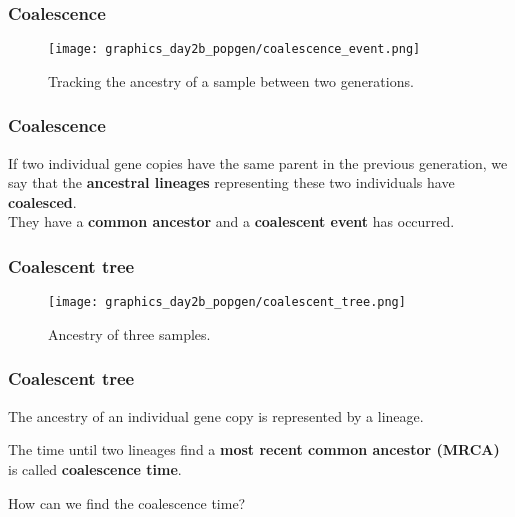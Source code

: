 \documentclass{beamer}
\newcommand{\1}{\ensuremath{\mathbf{1}}}
\begin{document}
%
%
%
\begin{frame}\frametitle{Coalescence}
	\begin{figure}
	\begin{center}
		\texttt{[image: graphics\_day2b\_popgen/coalescence\_event.png]}
	\end{center}
	\caption{Tracking the ancestry of a sample between two generations.}
	\end{figure}
\end{frame}
%
%
%
\begin{frame}\frametitle{Coalescence}
	If two individual gene copies have the same parent in the previous generation, we say that the \textbf{ancestral lineages} representing these two individuals have \textbf{coalesced}.\\[2ex]
	They have a \textbf{common ancestor} and a \textbf{coalescent event} has occurred.
\end{frame}
%
%
%
\begin{frame}\frametitle{Coalescent tree}
	\begin{figure}
	\begin{center}
		\texttt{[image: graphics\_day2b\_popgen/coalescent\_tree.png]}
	\end{center}
	\caption{Ancestry of three samples.}
	\end{figure}
\end{frame}
%
%
%
\begin{frame}\frametitle{Coalescent tree}
	The ancestry of an individual gene copy is represented by a lineage.\\[1.5ex]
	\begin{block}{}
		The time until two lineages find a \textbf{most recent common ancestor (MRCA)} is called \textbf{coalescence time}.
	\end{block}
	How can we find the coalescence time?
\end{frame}
\end{document}
